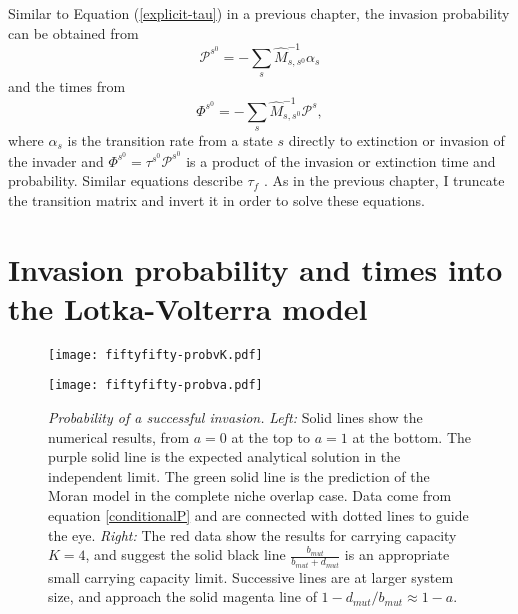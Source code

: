 Similar to Equation (\ref{explicit-tau}) in a previous chapter, the invasion probability can be obtained from \cite{Nisbet1982,Iyer-Biswas2015}
\begin{equation}
\mathcal{P}^{s^0} = -\sum_s \hat{M}^{-1}_{s,s^0}\alpha_{s} %
\end{equation} \label{conditionalP}
and the times from
\begin{equation}
\Phi^{s^0} = -\sum_s \hat{M}^{-1}_{s,s^0}\mathcal{P}^{s}, %
\end{equation} \label{conditionalPhi}
where $\alpha_s$ is the transition rate from a state $s$ directly to extinction or invasion of the invader and $\Phi^{s^0}=\tau^{s^0}\mathcal{P}^{s^0}$ is a product of the invasion or extinction time and probability. 
Similar equations describe $\tau_f$ \cite{Nisbet1982,Iyer-Biswas2015}.
As in the previous chapter, I truncate the transition matrix and invert it in order to solve these equations. 


\section{Invasion probability and times into the Lotka-Volterra model}
\begin{figure}[h]
	\centering
	\begin{minipage}{0.49\linewidth}
		\centering
		\texttt{[image: fiftyfifty-probvK.pdf]}
	\end{minipage}
	\begin{minipage}{0.49\linewidth}
		\centering
		\texttt{[image: fiftyfifty-probva.pdf]}
	\end{minipage}
	\caption{\emph{Probability of a successful invasion.}
		\emph{Left:} Solid lines show the numerical results, from $a=0$ at the top to $a=1$ at the bottom. The purple solid line is the expected analytical solution in the independent limit. The green solid line is the prediction of the Moran model in the complete niche overlap case. Data come from equation \ref{conditionalP} and are connected with dotted lines to guide the eye. 
		\emph{Right:} The red data show the results for carrying capacity $K=4$, and suggest the solid black line $\frac{b_{mut}}{b_{mut}+d_{mut}}$ is an appropriate small carrying capacity limit. Successive lines are at larger system size, and approach the solid magenta line of $1-d_{mut}/b_{mut}\approx 1-a$.
	} \label{Esucc}
\end{figure}

